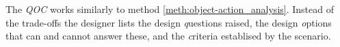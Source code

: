 \begin{method}[QOC]
  The \emph{QOC} works similarly to method \ref{meth:object-action_analysis}. Instead of the trade-offs the designer lists the design \emph{q}uestions raised, the design \emph{o}ptions that can and cannot answer these, and the \emph{c}riteria establised by the scenario. \cite[p. 69]{benyon14}
\end{method}